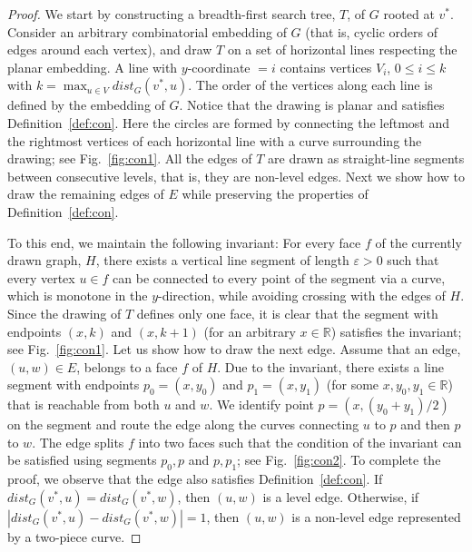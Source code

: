 \documentclass[orivec]{llncs}
\newcommand{\eps}{\ensuremath{\varepsilon}}
\begin{document}
\begin{proof}
    We start by constructing a breadth-first search tree, $T$, of $G$ rooted at $v^*$.    
    Consider an arbitrary combinatorial embedding of $G$ (that is, cyclic orders of edges around each vertex), 
    and draw $T$ on a set of horizontal lines respecting the planar embedding. A line with $y$-coordinate $=i$
    contains vertices $V_i$, $0 \le i \le k$ with $k = \max_{u \in V} dist_G(v^*, u)$. The order
    of the vertices along each line is defined by the embedding of $G$.
    Notice that the drawing is planar and satisfies Definition~\ref{def:con}. Here the circles are formed by 
    connecting the leftmost and the rightmost vertices of each horizontal line with a curve surrounding the drawing; see Fig.~\ref{fig:con1}. All the edges of $T$ are drawn as straight-line segments between consecutive
    levels, that is, they are non-level edges.
    Next we show how to draw the remaining edges of $E$ while preserving the properties of Definition~\ref{def:con}.
    
    To this end, we maintain the following invariant: For every face $f$ of the currently drawn graph, $H$,
    there exists a vertical line segment of length $\eps > 0$ such that every vertex $u \in f$ can be connected to
    every point of the segment via a curve, which is monotone in the $y$-direction, while avoiding crossing with the edges of $H$.
    Since the drawing of $T$ defines only one face, it is clear that the segment with endpoints $(x, k)$ and $(x, k+1)$
    (for an arbitrary $x \in \mathbb{R}$) satisfies the invariant; see Fig.~\ref{fig:con1}. Let us show how to draw the next
    edge. Assume that an edge, $(u, w) \in E$, belongs to a face $f$ of $H$. Due to the invariant, there exists a
    line segment with endpoints $p_0=(x, y_0)$ and $p_1=(x, y_1)$ (for some $x, y_0, y_1 \in \mathbb{R}$) that is reachable
    from both $u$ and $w$. We identify point $p=(x, (y_0 + y_1) / 2)$ on the segment and route the edge
    along the curves connecting $u$ to $p$ and then $p$ to $w$. The edge splits $f$ into two faces
    such that the condition of the invariant can be satisfied using segments $p_0, p$ and $p, p_1$; see Fig.~\ref{fig:con2}.    
    To complete the proof, we
    observe that the edge also satisfies Definition~\ref{def:con}. If $dist_G(v^*, u) = dist_G(v^*, w)$, then $(u, w)$
    is a level edge. 
    Otherwise, if $|dist_G(v^*, u) - dist_G(v^*, w)| = 1$, then $(u, w)$ is a non-level edge
    represented by a two-piece curve.
\end{proof}    
\end{document}

